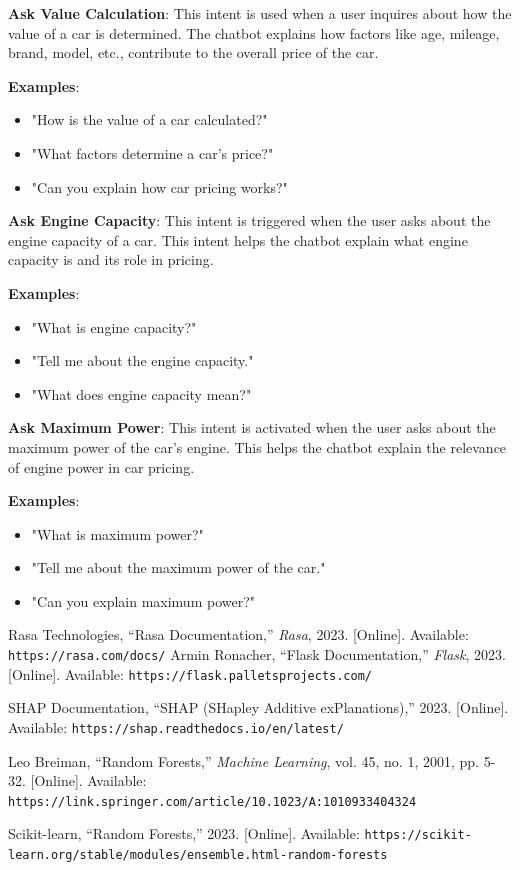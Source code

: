 \documentclass[a4paper,12pt]{article}
\begin{document}
\textbf{Ask Value Calculation}: This intent is used when a user inquires about how the value of a car is determined. The chatbot explains how factors like age, mileage, brand, model, etc., contribute to the overall price of the car.

\textbf{Examples}:
\begin{itemize}
    \item "How is the value of a car calculated?"
    \item "What factors determine a car's price?"
    \item "Can you explain how car pricing works?"
\end{itemize}

\textbf{Ask Engine Capacity}: This intent is triggered when the user asks about the engine capacity of a car. This intent helps the chatbot explain what engine capacity is and its role in pricing.

\textbf{Examples}:
\begin{itemize}
    \item "What is engine capacity?"
    \item "Tell me about the engine capacity."
    \item "What does engine capacity mean?"
\end{itemize}

\textbf{Ask Maximum Power}: This intent is activated when the user asks about the maximum power of the car's engine. This helps the chatbot explain the relevance of engine power in car pricing.

\textbf{Examples}:
\begin{itemize}
    \item "What is maximum power?"
    \item "Tell me about the maximum power of the car."
    \item "Can you explain maximum power?"
\end{itemize}




\begin{thebibliography}{9}

Rasa Technologies, ``Rasa Documentation,'' \textit{Rasa}, 2023. [Online]. Available: \texttt{https://rasa.com/docs/}
Armin Ronacher, ``Flask Documentation,'' \textit{Flask}, 2023. [Online]. Available: \texttt{https://flask.palletsprojects.com/}


SHAP Documentation, ``SHAP (SHapley Additive exPlanations),'' 2023. [Online]. Available: \texttt{https://shap.readthedocs.io/en/latest/}

Leo Breiman, ``Random Forests,'' \textit{Machine Learning}, vol. 45, no. 1, 2001, pp. 5-32. [Online]. Available: \texttt{https://link.springer.com/article/10.1023/A:1010933404324}

Scikit-learn, ``Random Forests,'' 2023. [Online]. Available: \texttt{https://scikit-learn.org/stable/modules/ensemble.html-random-forests}

\end{thebibliography}
\end{document}
